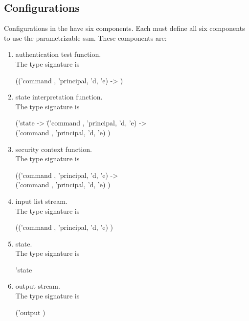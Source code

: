 \documentclass[../../main/main.tex]{subfiles}
\begin{document}
\subsection{Configurations}
Configurations in the  have six components.  Each  must define all six components to use the parametrizable ssm.  These components are:
\begin{enumerate}
\item authentication test function.  \\
The type signature is 

\hspace{0.5cm}  (('command , 'principal, 'd, 'e)  -> )

\item state interpretation function.  \\
The type signature is
\begin{tabbing}
\hspace{0.5cm}('state -> \=('command , 'principal, 'd, 'e)   -> \\
				      \>('command , 'principal, 'd, 'e)  ) 
\end{tabbing}
\item security context function.  \\
The type signature is 

 \hspace{0.5cm}   (('command , 'principal, 'd, 'e)   -> \\
\hspace{0.5cm}    ('command , 'principal, 'd, 'e)  ) 

\item input list stream.  \\
The type signature is

 \hspace{0.5cm}  (('command , 'principal, 'd, 'e)   ) \

\item state.  \\
The type signature is

\hspace{0.5cm}   'state

\item output stream.  \\
The type signature is 

\hspace{0.5cm} ('output )
\end{enumerate}
\end{document}
